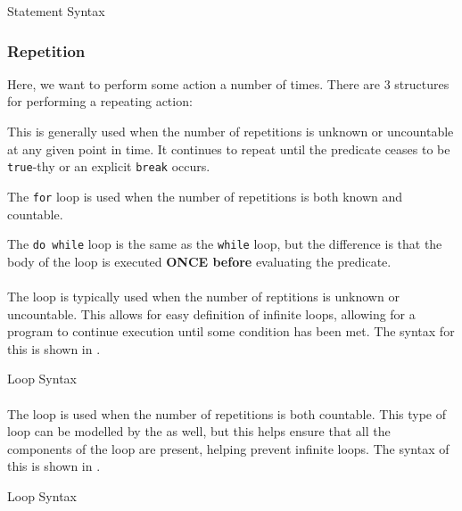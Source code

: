 \begin{listing}[h!tbp]
\caption{\texorpdfstring{}{\texttt{switch case}} Statement Syntax}
\label{lst:switch_case_Statement}
\end{listing}

\subsubsection{Repetition}\label{subsubsec:Repetition}
Here, we want to perform some action a number of times.
There are 3 structures for performing a repeating action:
\begin{description}[noitemsep]
\item[\nameref{par:while_Loop} Loop] This is generally used when the number of repetitions is unknown or uncountable at any given point in time.
  It continues to repeat until the predicate ceases to be \texttt{true}-thy or an explicit \texttt{break} occurs.

\item[\nameref{par:for_Loop} Loop] The \texttt{for} loop is used when the number of repetitions is both known and countable.

\item[\nameref{par:dowhile_Loop} Loop] The \texttt{do while} loop is the same as the \texttt{while} loop, but the difference is that the body of the loop is executed \textbf{ONCE before} evaluating the predicate.
\end{description}

\paragraph{\texorpdfstring{}{\texttt{while}}}\label{par:while_Loop}
The  loop is typically used when the number of reptitions is unknown or uncountable.
This allows for easy definition of infinite loops, allowing for a program to continue execution until some condition has been met.
The syntax for this is shown in .

\begin{listing}[h!tbp]
\caption{\texorpdfstring{}{\texttt{while}} Loop Syntax}
\label{lst:while_Loop}
\end{listing}

\paragraph{\texorpdfstring{}{\texttt{for}}}\label{par:for_Loop}
The  loop is used when the number of repetitions is both countable.
This type of loop can be modelled by the  as well, but this helps ensure that all the components of the loop are present, helping prevent infinite loops.
The syntax of this is shown in .

\begin{listing}[h!tbp]
\caption{\texorpdfstring{}{\texttt{for}} Loop Syntax}
\label{lst:for_Loop}
\end{listing}


